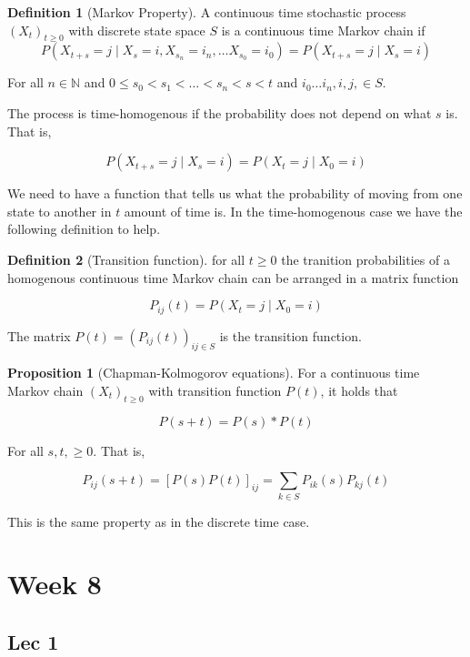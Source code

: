 \documentclass[12pt]{article}
\theoremstyle{definition}
\newtheorem{definition}{Definition}[section]
\newtheorem{proposition}{Proposition}[section]
\begin{document}
\begin{definition}[Markov Property]
  A continuous time stochastic process $(X_t)_{t \geq 0}$ with discrete state space $S$ is a continuous time Markov chain if
  $$
  P( X_{t +s} = j \mid X_s = i, X_{s_n} = i_n, \dots X_{s_0} = i_0) = P(X_{t +s} = j \mid X_s = i)
  $$

  For all $n \in \mathbb{N}$ and $ 0 \leq s_0 < s_1< \dots < s_n < s < t$ and $i_0 \dots i_n, i, j, \in S$.

  The process is time-homogenous if the probability does not depend on what $s$ is. That is,

  $$
  P(X_{t+s} = j \mid X_s = i) = P(X_t = j \mid X_0 = i)
  $$
\end{definition}

We need to have a function that tells us what the probability of moving from one state to another in $t$ amount of time is. In the time-homogenous case we have the following definition to help.

\begin{definition}[Transition function]
  for all $t \geq 0$ the tranition probabilities of a homogenous continuous time Markov chain can be arranged in a matrix function

  $$
  P_{ij}(t) = P(X_t = j \mid X_0 = i)
  $$

  The matrix $P(t) = (P_{ij}(t))_{ij \in S}$ is the transition function.
\end{definition}

\begin{proposition}[Chapman-Kolmogorov equations]
  For a continuous time Markov chain $(X_t)_{t \geq 0}$ with transition function $P(t)$, it holds that

  $$
  P(s +t) = P(s) * P(t)
  $$

  For all $s, t, \geq 0$. That is,

  $$
  P_{ij}(s +t) = [P(s)P(t)]_{ij} = \sum_{k \in S}P_{ik}(s)P_{kj}(t)
  $$

\end{proposition}

This is the same property as in the discrete time case.

\section{Week 8}
\subsection{Lec 1}
\end{document}
